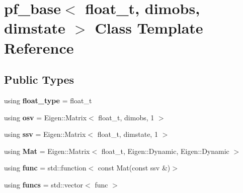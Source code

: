 \hypertarget{classpf__base}{}\section{pf\+\_\+base$<$ float\+\_\+t, dimobs, dimstate $>$ Class Template Reference}
\label{classpf__base}
\subsection*{Public Types}
\begin{DoxyCompactItemize}
\item 
\mbox{\label{classpf__base_a5c38fdea8b41026d6c5709be11065f0a}} 
using {\bfseries float\+\_\+type} = float\+\_\+t
\item 
\mbox{\label{classpf__base_ab468bc1a4c41a4ad7372281a1db7db8b}} 
using {\bfseries osv} = Eigen\+::\+Matrix$<$ float\+\_\+t, dimobs, 1 $>$
\item 
\mbox{\label{classpf__base_add01ddbbba6953260f53d47bae2888d2}} 
using {\bfseries ssv} = Eigen\+::\+Matrix$<$ float\+\_\+t, dimstate, 1 $>$
\item 
\mbox{\label{classpf__base_a6b7fbe89aa5e34880ad81a5f48e82a04}} 
using {\bfseries Mat} = Eigen\+::\+Matrix$<$ float\+\_\+t, Eigen\+::\+Dynamic, Eigen\+::\+Dynamic $>$
\item 
\mbox{\label{classpf__base_ae409bcfbd5e1bc542134c4e9b6dce6c3}} 
using {\bfseries func} = std\+::function$<$ const Mat(const ssv \&)$>$
\item 
\mbox{\label{classpf__base_a0c328d66f991393ec0f1a082d5cbf4a6}} 
using {\bfseries funcs} = std\+::vector$<$ func $>$
\end{DoxyCompactItemize}
